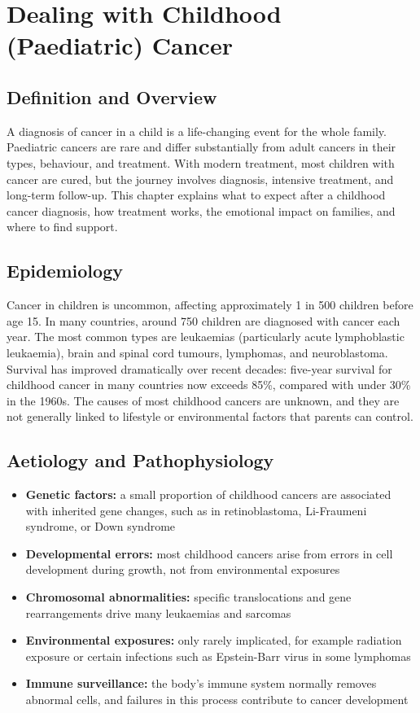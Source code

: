 \chapter{Dealing with Childhood (Paediatric) Cancer}

\section*{Definition and Overview}
A diagnosis of cancer in a child is a life-changing event for the whole family. Paediatric cancers are rare and differ substantially from adult cancers in their types, behaviour, and treatment. With modern treatment, most children with cancer are cured, but the journey involves diagnosis, intensive treatment, and long-term follow-up. This chapter explains what to expect after a childhood cancer diagnosis, how treatment works, the emotional impact on families, and where to find support.

\section*{Epidemiology}
Cancer in children is uncommon, affecting approximately 1 in 500 children before age 15. In many countries, around 750 children are diagnosed with cancer each year. The most common types are leukaemias (particularly acute lymphoblastic leukaemia), brain and spinal cord tumours, lymphomas, and neuroblastoma. Survival has improved dramatically over recent decades: five-year survival for childhood cancer in many countries now exceeds 85\%, compared with under 30\% in the 1960s. The causes of most childhood cancers are unknown, and they are not generally linked to lifestyle or environmental factors that parents can control.

\section*{Aetiology and Pathophysiology}
\begin{itemize}
    \item \textbf{Genetic factors:} a small proportion of childhood cancers are associated with inherited gene changes, such as in retinoblastoma, Li-Fraumeni syndrome, or Down syndrome
    \item \textbf{Developmental errors:} most childhood cancers arise from errors in cell development during growth, not from environmental exposures
    \item \textbf{Chromosomal abnormalities:} specific translocations and gene rearrangements drive many leukaemias and sarcomas
    \item \textbf{Environmental exposures:} only rarely implicated, for example radiation exposure or certain infections such as Epstein-Barr virus in some lymphomas
    \item \textbf{Immune surveillance:} the body's immune system normally removes abnormal cells, and failures in this process contribute to cancer development
\end{itemize}

